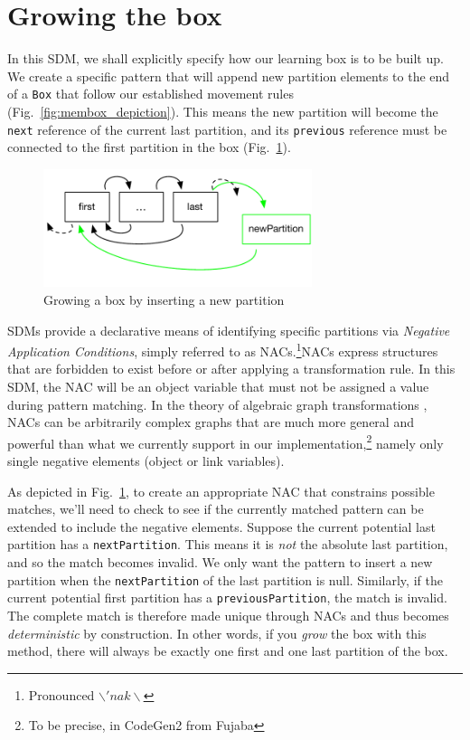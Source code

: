 \newpage
\section{Growing the box}
\genHeader

In this SDM, we shall explicitly specify how our learning box is to be built up. We create a specific pattern that will append new partition elements to the end
of a \texttt{Box} that follow our established movement rules (Fig.~\ref{fig:membox_depiction}). This means the new partition will become the \texttt{next}
reference of the current last partition, and its \texttt{previous} reference must be connected to the first partition in the box (Fig.~\ref{fig:goal_grow}).

\begin{figure}[htbp]
 	\centering
  	\includegraphics[width=0.7\textwidth]{growBoxNACGoal.pdf}
	\caption{Growing a box by inserting a new partition}
	\label{fig:goal_grow}
\end{figure}
\FloatBarrier

SDMs provide a declarative means of identifying specific partitions via \emph{Negative Application Conditions}, simply referred to as
\mbox{NAC}s.\footnote{Pronounced $\backslash 'nak \backslash$}\mbox{NAC}s express structures that are forbidden to exist before or after applying a
transformation rule. In this SDM, the \mbox{NAC} will be an object variable that must not be assigned a value during pattern matching. In the theory of
algebraic graph transformations \cite{EEPT06}, \mbox{NACs} can be arbitrarily complex graphs that are much more general and powerful than what we currently
support in our implementation,\footnote{To be precise, in CodeGen2 from Fujaba} namely only single negative elements (object or link variables).

As depicted in Fig.~\ref{fig:goal_grow}, to create an appropriate \mbox{NAC} that constrains possible matches, we'll need to check to see if the currently
matched pattern can be extended to include the negative elements. Suppose the current potential last partition has a \texttt{nextPartition}. This means it
is \emph{not} the absolute last partition, and so the match becomes invalid. We only want the pattern to insert a new partition when the \texttt{nextPartition}
of the last partition is null. Similarly, if the current potential first partition has a \texttt{previousPartition}, the match is invalid. The complete match is
therefore made unique through NACs and thus becomes \emph{deterministic} by construction. In other words, if you \emph{grow} the box with this method, there
will always be exactly one first and one last partition of the box.

